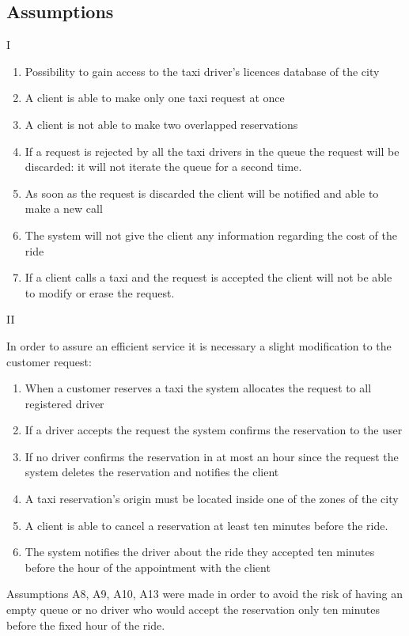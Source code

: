 \documentclass[9pt]{beamer}
\makeatletter
\newcommand*{\currentname}{\@currentlabelname}
\newcounter{saveenumi}
\newcommand{\seti}{\setcounter{saveenumi}{\value{enumi}}}
\newcommand{\conti}{\setcounter{enumi}{\value{saveenumi}}}
\makeatother
\begin{document}
\subsection{Assumptions}
\begin{frame}{\currentname{} I}
\begin{enumerate}[label=\bfseries A\arabic*:]
\item Possibility to gain access to the taxi driver's licences database of the city
\item A client is able to make only one taxi request at once
\item A client is not able to make two overlapped reservations
\item If a request is rejected by all the taxi drivers in the queue the request will be discarded: it will not iterate the queue for a second time.
\item As soon as the request is discarded the client will be notified and able to make a new call
\item The system will not give the client any information regarding the cost of the ride
\item If a client calls a taxi and the request is accepted the client will not be able to modify or erase the request.
\seti
\end{enumerate}

\end{frame}
\begin{frame}{\currentname{} II}

In order to assure an efficient service it is necessary a slight modification to the customer request:

\begin{enumerate}[label=\bfseries A\arabic*:]
\conti
\item When a customer reserves a taxi the system allocates the request to all registered driver
\item If a driver accepts the request the system confirms the reservation to the user
\item If no driver confirms the reservation in at most an hour since the request the system deletes the reservation and notifies the client
\item A taxi reservation's origin must be located inside one of the zones of the city
\item A client is able to cancel a reservation at least ten minutes before the ride.
\item The system notifies the driver about the ride they accepted ten minutes before the hour of the appointment with the client
\end{enumerate}

Assumptions A8, A9, A10, A13 were made in order to avoid the risk of having an empty queue or no driver who would accept the reservation only ten minutes before the fixed hour of the ride.
\end{frame}
\end{document}
